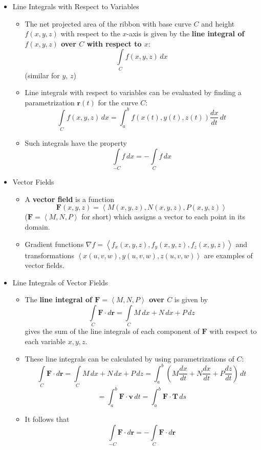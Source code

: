 \documentclass[12pt]{article}
\renewcommand{\vec}[1]{\mathbf{#1}}
\newcommand{\dvar}[1]{\,d{#1}}
\newcommand{\<}{\left<}
\renewcommand{\>}{\right>}
\begin{document}
  \begin{itemize}
  
  \item Line Integrals with Respect to Variables
  
    \begin{itemize}
      \item The net projected area of the ribbon with base curve $C$ and height $f(x,y,z)$ with respect to the $x$-axis is given by the \textbf{line integral of $f(x,y,z)$ over $C$ with respect to $x$}: \[\int\limits_C f(x,y,z)\,dx\] (similar for $y$, $z$)
      \item Line integrals with respect to variables can be evaluated by finding a parametrization $\vec{r}(t)$ for the curve $C$:
        \[
          \int\limits_C f(x,y,z)\,dx = \int_a^b f(x(t),y(t),z(t))\frac{dx}{dt}\,dt
        \]
      \item Such integrals have the property \[\int\limits_{-C} f\dvar{x} = -\int\limits_{C} f\dvar{x}\]
    \end{itemize}
  
  \item Vector Fields
  
    \begin{itemize}
    \item A \textbf{vector field} is a function \[\vec{F}(x,y,z)=\<M(x,y,z),N(x,y,z),P(x,y,z)\>\] ($\vec{F}=\<M,N,P\>$ for short) which assigns a vector to each point in its domain.
    \item Gradient functions $\nabla f=\<f_x(x,y,z),f_y(x,y,z),f_z(x,y,z)\>$ and transformations $\<x(u,v,w),y(u,v,w),z(u,v,w)\>$ are examples of vector fields.
    \end{itemize}
  
  \item Line Integrals of Vector Fields
  
    \begin{itemize}
    \item The \textbf{line integral of $\vec{F}=\<M,N,P\>$ over $C$} is given by 
      \[\int\limits_C \vec{F}\cdot d\vec{r} = \int\limits_C M\,dx + N\,dx + P\,dz\]
    gives the sum of the line integrals of each component of $\vec{F}$ with respect to each variable $x,y,z$.
    \item These line integrals can be calculated by using parametrizations of $C$: 
      \[
        \int\limits_C \vec{F}\cdot d\vec{r} = 
        \int\limits_C M\,dx + N\,dx + P\,dz = 
        \int_a^b \left(M\frac{dx}{dt} + N\frac{dx}{dt} + P\frac{dz}{dt}\right)\,dt 
      \]
      \[
        =
        \int_a^b \vec{F}\cdot\vec{v}\,dt =
        \int_a^b \vec{F}\cdot\vec{T}\,ds 
      \]
    \item It follows that \[\int\limits_{-C} \vec{F}\cdot d\vec{r} = - \int\limits_C \vec{F}\cdot d\vec{r}\]
    \end{itemize}
    

\end{itemize}
\end{document}
